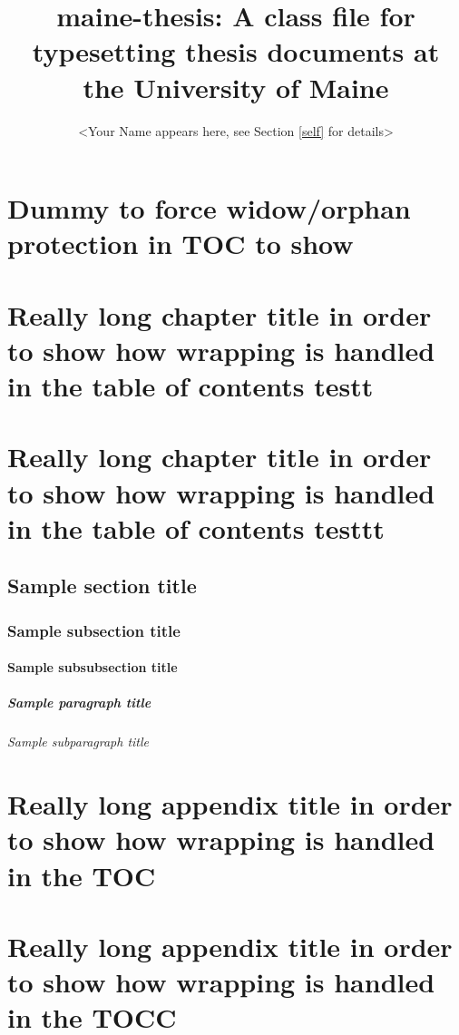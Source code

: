 \documentclass[headings, multiappendices]{maine-thesis}
\title{maine-thesis: A class file for typesetting thesis documents at the University of Maine}
\author{<Your Name appears here, see Section \ref{self} for details>}
\begin{document}
\preliminary
\maketitle



\chapter{Dummy to force widow/orphan protection in TOC to show}




\chapter{Really long chapter title in order to show how wrapping is handled in the table of contents testt}
\chapter{Really long chapter title in order to show how wrapping is handled in the table of contents testtt}
\blindtext
\section{Sample section title}
\blindtext
\subsection{Sample subsection title}
\blindtext
\subsubsection{Sample subsubsection title}
\blindtext
\paragraph{Sample paragraph title}
\blindtext
\subparagraph{Sample subparagraph title}
\blindtext


\begin{appendices}


\chapter{Really long appendix title in order to show how wrapping is handled in the TOC}
\chapter{Really long appendix title in order to show how wrapping is handled in the TOCC}
\end{appendices}


\end{document}
